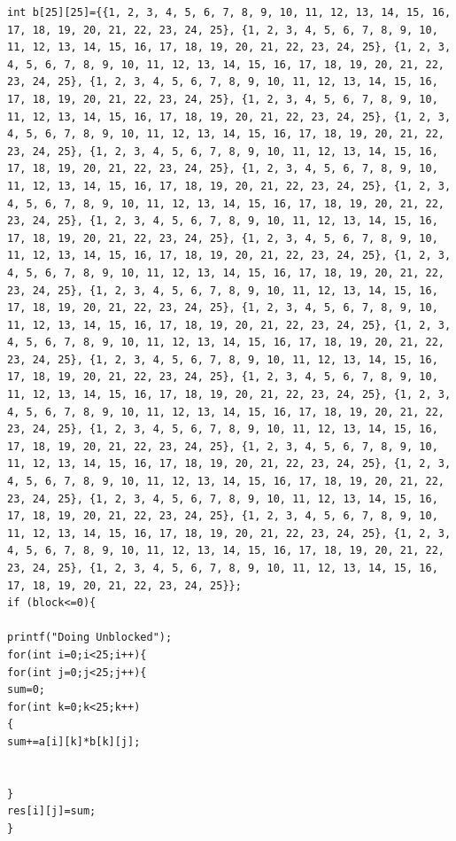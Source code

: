 \documentclass[10pt,a4paper]{article}
\begin{document}
\begin{lstlisting}
int b[25][25]={{1, 2, 3, 4, 5, 6, 7, 8, 9, 10, 11, 12, 13, 14, 15, 16, 17, 18, 19, 20, 21, 22, 23, 24, 25}, {1, 2, 3, 4, 5, 6, 7, 8, 9, 10, 11, 12, 13, 14, 15, 16, 17, 18, 19, 20, 21, 22, 23, 24, 25}, {1, 2, 3, 4, 5, 6, 7, 8, 9, 10, 11, 12, 13, 14, 15, 16, 17, 18, 19, 20, 21, 22, 23, 24, 25}, {1, 2, 3, 4, 5, 6, 7, 8, 9, 10, 11, 12, 13, 14, 15, 16, 17, 18, 19, 20, 21, 22, 23, 24, 25}, {1, 2, 3, 4, 5, 6, 7, 8, 9, 10, 11, 12, 13, 14, 15, 16, 17, 18, 19, 20, 21, 22, 23, 24, 25}, {1, 2, 3, 4, 5, 6, 7, 8, 9, 10, 11, 12, 13, 14, 15, 16, 17, 18, 19, 20, 21, 22, 23, 24, 25}, {1, 2, 3, 4, 5, 6, 7, 8, 9, 10, 11, 12, 13, 14, 15, 16, 17, 18, 19, 20, 21, 22, 23, 24, 25}, {1, 2, 3, 4, 5, 6, 7, 8, 9, 10, 11, 12, 13, 14, 15, 16, 17, 18, 19, 20, 21, 22, 23, 24, 25}, {1, 2, 3, 4, 5, 6, 7, 8, 9, 10, 11, 12, 13, 14, 15, 16, 17, 18, 19, 20, 21, 22, 23, 24, 25}, {1, 2, 3, 4, 5, 6, 7, 8, 9, 10, 11, 12, 13, 14, 15, 16, 17, 18, 19, 20, 21, 22, 23, 24, 25}, {1, 2, 3, 4, 5, 6, 7, 8, 9, 10, 11, 12, 13, 14, 15, 16, 17, 18, 19, 20, 21, 22, 23, 24, 25}, {1, 2, 3, 4, 5, 6, 7, 8, 9, 10, 11, 12, 13, 14, 15, 16, 17, 18, 19, 20, 21, 22, 23, 24, 25}, {1, 2, 3, 4, 5, 6, 7, 8, 9, 10, 11, 12, 13, 14, 15, 16, 17, 18, 19, 20, 21, 22, 23, 24, 25}, {1, 2, 3, 4, 5, 6, 7, 8, 9, 10, 11, 12, 13, 14, 15, 16, 17, 18, 19, 20, 21, 22, 23, 24, 25}, {1, 2, 3, 4, 5, 6, 7, 8, 9, 10, 11, 12, 13, 14, 15, 16, 17, 18, 19, 20, 21, 22, 23, 24, 25}, {1, 2, 3, 4, 5, 6, 7, 8, 9, 10, 11, 12, 13, 14, 15, 16, 17, 18, 19, 20, 21, 22, 23, 24, 25}, {1, 2, 3, 4, 5, 6, 7, 8, 9, 10, 11, 12, 13, 14, 15, 16, 17, 18, 19, 20, 21, 22, 23, 24, 25}, {1, 2, 3, 4, 5, 6, 7, 8, 9, 10, 11, 12, 13, 14, 15, 16, 17, 18, 19, 20, 21, 22, 23, 24, 25}, {1, 2, 3, 4, 5, 6, 7, 8, 9, 10, 11, 12, 13, 14, 15, 16, 17, 18, 19, 20, 21, 22, 23, 24, 25}, {1, 2, 3, 4, 5, 6, 7, 8, 9, 10, 11, 12, 13, 14, 15, 16, 17, 18, 19, 20, 21, 22, 23, 24, 25}, {1, 2, 3, 4, 5, 6, 7, 8, 9, 10, 11, 12, 13, 14, 15, 16, 17, 18, 19, 20, 21, 22, 23, 24, 25}, {1, 2, 3, 4, 5, 6, 7, 8, 9, 10, 11, 12, 13, 14, 15, 16, 17, 18, 19, 20, 21, 22, 23, 24, 25}, {1, 2, 3, 4, 5, 6, 7, 8, 9, 10, 11, 12, 13, 14, 15, 16, 17, 18, 19, 20, 21, 22, 23, 24, 25}, {1, 2, 3, 4, 5, 6, 7, 8, 9, 10, 11, 12, 13, 14, 15, 16, 17, 18, 19, 20, 21, 22, 23, 24, 25}, {1, 2, 3, 4, 5, 6, 7, 8, 9, 10, 11, 12, 13, 14, 15, 16, 17, 18, 19, 20, 21, 22, 23, 24, 25}};
if (block<=0){

printf("Doing Unblocked");
for(int i=0;i<25;i++){
for(int j=0;j<25;j++){
sum=0;
for(int k=0;k<25;k++)
{
sum+=a[i][k]*b[k][j];


}
res[i][j]=sum;
}


\end{lstlisting}
\end{document}
